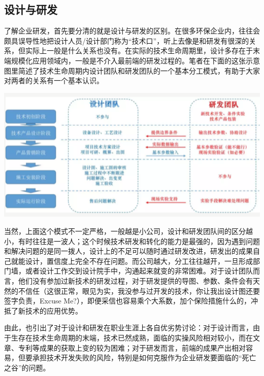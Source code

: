 \documentclass[
]{book}
\begin{document}
\hypertarget{ux8bbeux8ba1ux4e0eux7814ux53d1}{%
\subsection{设计与研发}\label{ux8bbeux8ba1ux4e0eux7814ux53d1}}

了解企业研发，首先要分清的就是设计与研发的区别。在很多环保企业内，往往会颇具误导性地把设计人员/设计部门称为``技术口''，听上去像是和研发有很深的关系，但实际上一般是什么关系也没有。在实际的技术生命周期里，设计多存在于末端规模化应用领域内，一般是不介入最前端的研发过程的。笔者在下面的这张示意图里简述了技术生命周期内设计团队和研发团队的一个基本分工模式，有助于大家对两者的关系有一个基本认识。

\includegraphics[width=6.67in]{images/qiye2}

当然，上面这个模式不一定严格，一般越是小公司，设计和研发团队间的区分越小，有时往往是一波人；这个时候技术研发和转化的能力是最强的，因为遇到问题和解决问题的是同一拨人，设计上的不足可以随时通过研发改进，研发出的成果自己就能设计，置信度上完全不存在问题。而公司越大，分工往往越开，一旦形成部门墙，或者设计工作交到设计院手中，沟通起来就变的非常困难。对于设计团队而言，他们没有参加过新技术的研发过程，对于研发提供的导图、参数、条件会有天然的不信任（这很正常，眼见为实，我没参与过开发的技术，你让我出设计图还要签字负责，Excuse Me?），即便采信也容易乘个大系数，加个保险措施什么的，冲抵了新技术的应用优势。

由此，也引出了对于设计和研发在职业生涯上各自优劣势讨论：对于设计而言，由于生存在技术生命周期的末端，技术已然成熟，面临的实操风险相对较小，而在文章、专利等成果的获取上变的较为困难；对于研发而言，前端的成果产出相对容易，但要承担技术开发失败的风险，特别是如何克服作为企业研发要面临的``死亡之谷''的问题。
\end{document}

